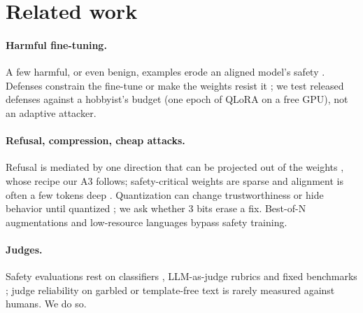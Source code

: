 \section{Related work}
\label{sec:related}

\paragraph{Harmful fine-tuning.} A few harmful, or even benign, examples erode an aligned model's safety
\citep{qi2024finetuning,yang2023shadow,lermen2023lora,zhan2024removing,huang2024survey}. Defenses constrain the
fine-tune \citep{huang2024lisa,yi2025safegrad} or make the weights resist it
\citep{henderson2023selfdestructing,rosati2024representation,tamirisa2025tamper}; we test released defenses against
a hobbyist's budget (one epoch of QLoRA on a free GPU), not an adaptive attacker.

\paragraph{Refusal, compression, cheap attacks.} Refusal is mediated by one direction that can be projected out of
the weights \citep{arditi2024refusal}, whose recipe our A3 follows; safety-critical weights are sparse
\citep{wei2024brittleness} and alignment is often a few tokens deep \citep{qi2025shallow}. Quantization can change
trustworthiness \citep{hong2024decoding} or hide behavior until quantized \citep{egashira2024exploiting}; we ask
whether 3 bits erase a fix. Best-of-N augmentations \citep{hughes2024bon} and low-resource languages
\citep{yong2023lowresource,deng2024multilingual} bypass safety training.

\paragraph{Judges.} Safety evaluations rest on classifiers \citep{inan2023llamaguard,han2024wildguard}, LLM-as-judge
rubrics \citep{zheng2023judging,souly2024strongreject} and fixed benchmarks
\citep{mazeika2024harmbench,chao2024jailbreakbench}; judge reliability on garbled or template-free text is rarely
measured against humans. We do so.

